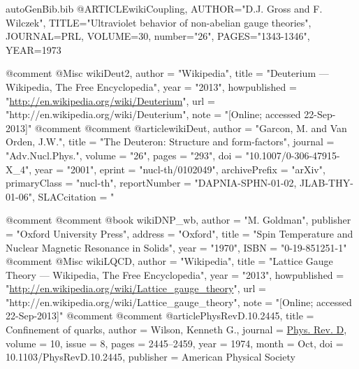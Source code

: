 \begin{filecontents*}{autoGenBib.bib}
@ARTICLE{wikiCoupling,
   AUTHOR="D.J. Gross and F. Wilczek", 
   TITLE="Ultraviolet behavior of non-abelian gauge theories",
   JOURNAL=PRL,
   VOLUME=30,   
   number="26",
   PAGES="1343-1346",
   YEAR=1973  
}

@comment %
@Misc{ wikiDeut2,
  author = "Wikipedia",
  title = "Deuterium --- {W}ikipedia{,} The Free Encyclopedia",
  year = "2013",
  howpublished = "\url{http://en.wikipedia.org/wiki/Deuterium}",
  url = "http://en.wikipedia.org/wiki/Deuterium",
  note = "[Online; accessed 22-Sep-2013]"
}	
@comment %
@comment %
@article{wikiDeut,
      author         = "Garcon, M. and Van Orden, J.W.",
      title          = "{The Deuteron: Structure and form-factors}",
      journal        = "Adv.Nucl.Phys.",
      volume         = "26",
      pages          = "293",
      doi            = "10.1007/0-306-47915-X_4",
      year           = "2001",
      eprint         = "nucl-th/0102049",
      archivePrefix  = "arXiv",
      primaryClass   = "nucl-th",
      reportNumber   = "DAPNIA-SPHN-01-02, JLAB-THY-01-06",
      SLACcitation   = "%
}

@comment %
@comment %
@book{ wikiDNP_wb,
	author = "M. Goldman",
	publisher = "Oxford University Press",
	address = "Oxford",
	title = "Spin Temperature and Nuclear Magnetic Resonance in Solids",
	year = "1970",
	ISBN = "0-19-851251-1"
}
@comment %
@Misc{ wikiLQCD,
  author = "Wikipedia",
  title = "Lattice Gauge Theory --- {W}ikipedia{,} The Free Encyclopedia",
  year = "2013",
  howpublished = "\url{http://en.wikipedia.org/wiki/Lattice_gauge_theory}",
  url = "http://en.wikipedia.org/wiki/Lattice_gauge_theory",
  note = "[Online; accessed 22-Sep-2013]"
}
@comment %
@comment %
@article{PhysRevD.10.2445,
  title = {Confinement of quarks},
  author = {Wilson, Kenneth G.},
  journal = {\href{http://link.aps.org/doi/10.1103/PhysRevD.10.2445}{Phys. Rev. D}},
  volume = {10},
  issue = {8},
  pages = {2445--2459},
  year = {1974},
  month = {Oct},
  doi = {10.1103/PhysRevD.10.2445},
  publisher = {American Physical Society}
}


\end{filecontents*}
